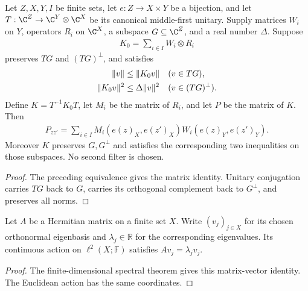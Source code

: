 \begin{lemma}
    \label{lem:global_filter_from_middle_first_decomposition}
    \leanok
    Let $Z,X,Y,I$ be finite sets, let $e:Z\to X\times Y$ be a
    bijection, and let $T:\C^Z\to\C^Y\otimes\C^X$ be its canonical
    middle-first unitary. Supply matrices $W_i$ on $Y$, operators
    $R_i$ on $\C^X$, a subspace $G\subseteq\C^Z$, and a real number
    $\Delta$. Suppose
    \begin{align}
        K_0=\sum_{i\in I}W_i\otimes R_i
    \end{align}
    preserves $TG$ and $(TG)^\perp$, and satisfies
    \begin{align}
        \|v\|&\le\|K_0v\| &&(v\in TG),\notag\\
        \|K_0v\|^2&\le\Delta\|v\|^2 &&(v\in(TG)^\perp).
    \end{align}
    Define $K=T^{-1}K_0T$, let $M_i$ be the matrix of $R_i$, and let
    $P$ be the matrix of $K$. Then
    \begin{align}
        P_{zz'}=\sum_{i\in I}M_i(e(z)_X,e(z')_X)W_i(e(z)_Y,e(z')_Y).
    \end{align}
    Moreover $K$ preserves $G,G^\perp$ and satisfies the corresponding
    two inequalities on those subspaces. No second filter is chosen.
\end{lemma}
\begin{proof}\leanok
    The preceding equivalence gives the matrix identity. Unitary
    conjugation carries $TG$ back to $G$, carries its orthogonal
    complement back to $G^\perp$, and preserves all norms.
\end{proof}

\begin{theorem}
    \label{thm:euclidean_hermitian_eigenvector}
    \leanok
    Let $A$ be a Hermitian matrix on a finite set $X$. Write
    $(v_j)_{j\in X}$ for its chosen orthonormal eigenbasis and
    $\lambda_j\in\mathbb R$ for the corresponding eigenvalues. Its
    continuous action on $\ell^2(X;\mathbb F)$ satisfies
    $Av_j=\lambda_jv_j$.
\end{theorem}
\begin{proof}\leanok
    The finite-dimensional spectral theorem gives this matrix-vector
    identity. The Euclidean action has the same coordinates.
\end{proof}
